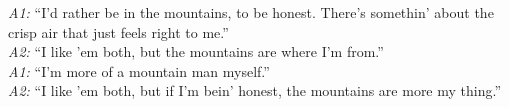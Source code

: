 \begin{tcolorbox}
\textit{A1:} ``I'd rather be in the mountains, to be honest. There's somethin' about the crisp air that just feels right to me.''\\[-2pt]
\textit{A2:} ``I like 'em both, but the mountains are where I'm from.''\\[-2pt]
\textit{A1:} ``I'm more of a mountain man myself.''\\[-2pt]
\textit{A2:} ``I like 'em both, but if I'm bein' honest, the mountains are more my thing.''

\end{tcolorbox}
